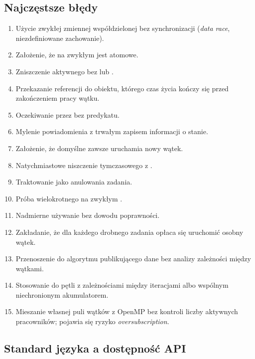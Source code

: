 \subsection{Najczęstsze błędy}

\begin{enumerate}
\item Użycie zwykłej zmiennej współdzielonej bez synchronizacji
(\emph{data race}, niezdefiniowane zachowanie).
\item Założenie, że  na zwykłym  jest atomowe.
\item Zniszczenie aktywnego  bez  lub .
\item Przekazanie referencji do obiektu, którego czas życia kończy się
przed zakończeniem pracy wątku.
\item Oczekiwanie przez  bez predykatu.
\item Mylenie powiadomienia z trwałym zapisem informacji o stanie.
\item Założenie, że domyślne  zawsze uruchamia nowy wątek.
\item Natychmiastowe niszczenie tymczasowego  z .
\item Traktowanie  jako anulowania zadania.
\item Próba wielokrotnego  na zwykłym .
\item Nadmierne używanie  bez dowodu poprawności.
\item Zakładanie, że dla każdego drobnego zadania opłaca się uruchomić
osobny wątek.
\item Przenoszenie  do algorytmu publikującego dane
bez analizy zależności między wątkami.
\item Stosowanie  do pętli z zależnościami
między iteracjami albo wspólnym niechronionym akumulatorem.
\item Mieszanie własnej puli wątków z OpenMP bez kontroli liczby aktywnych
pracowników; pojawia się ryzyko \emph{oversubscription}.
\end{enumerate}

\subsection{Standard języka a dostępność API}

